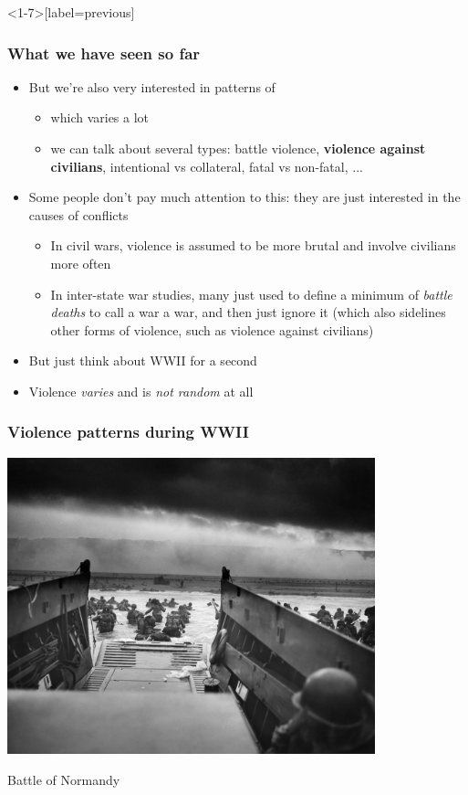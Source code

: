 \documentclass[aspectratio=43]{beamer}
\begin{document}
\begin{frame}<1-7>[label=previous]
\frametitle{What we have seen so far}
\centering

\begin{itemize}[<+->]
  \item But we're also very interested in patterns of 
  \begin{itemize}
    \item which varies a lot
    \item we can talk about several types: battle violence, \textbf{violence against civilians}, intentional vs collateral, fatal vs non-fatal, ...
  \end{itemize}
  \item Some people don't pay much attention to this: they are just interested in the causes of conflicts
  \begin{itemize}
    \item In civil wars, violence is assumed to be more brutal and involve civilians more often
    \item In inter-state war studies, many just used to define a minimum of \textit{battle deaths} to call a war a war, and then just ignore it (which also sidelines other forms of violence, such as violence against civilians)
  \end{itemize}
  \item But just think about WWII for a second
  \item Violence \textit{varies} and is \textit{not random} at all
\end{itemize}

\end{frame}

\begin{frame}
\frametitle{Violence patterns during WWII}
\centering

\includegraphics[width = 0.8\textwidth]{img/wwii-normandy}

Battle of Normandy

\end{frame}
\end{document}

